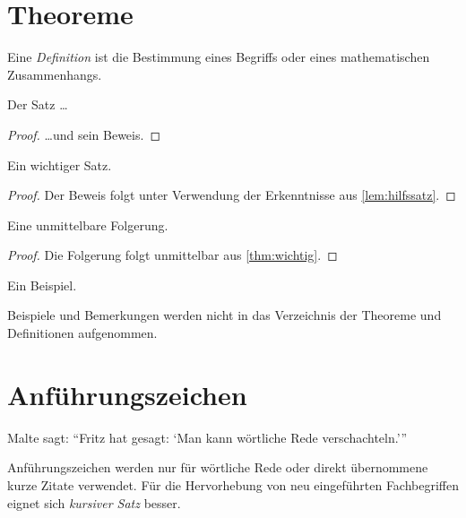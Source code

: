 \section{Theoreme}

\begin{Definition}[Definition]
  Eine \emph{Definition} ist die Bestimmung eines Begriffs oder eines mathematischen Zusammenhangs.
\end{Definition}

\begin{Lemma}
  \label{lem:hilfssatz}
  Der Satz \ldots
\end{Lemma}

\begin{proof}
  \ldots und sein Beweis.
\end{proof}

\begin{Theorem}
  \label{thm:wichtig}
  Ein wichtiger Satz.
\end{Theorem}

\begin{proof}
  Der Beweis folgt unter Verwendung der Erkenntnisse aus \vref{lem:hilfssatz}.
\end{proof}

\begin{Korollar}
  Eine unmittelbare Folgerung.
\end{Korollar}

\begin{proof}
  Die Folgerung folgt unmittelbar aus \vref{thm:wichtig}.
\end{proof}

\begin{Beispiel}
  Ein Beispiel.
\end{Beispiel}

\begin{Bemerkung}
  Beispiele und Bemerkungen werden nicht in das Verzeichnis der Theoreme und Definitionen aufgenommen.
\end{Bemerkung}

\section{Anführungszeichen}

Malte sagt: \enquote{Fritz hat gesagt: \enquote{Man kann wörtliche Rede verschachteln.}}

Anführungszeichen werden nur für wörtliche Rede oder direkt übernommene kurze Zitate verwendet. Für die Hervorhebung von neu eingeführten Fachbegriffen eignet sich \emph{kursiver Satz} besser.
